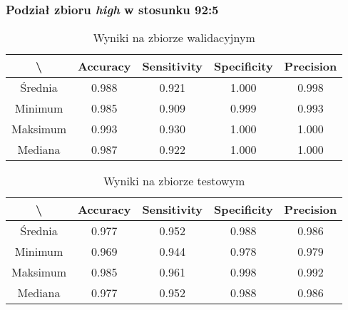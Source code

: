 \newpage
\subsubsection{Podział zbioru \textit{high} w stosunku 92:5}

\begin{table}[!h]
	\centering
	\caption{Wyniki na zbiorze walidacyjnym}
	\vspace{6pt}
	{\footnotesize
		\begin{tabular}{|c|c|c|c|c|}
      \hline \textbackslash & Accuracy & Sensitivity & Specificity & Precision \\
      \hline Średnia & 0.988 & 0.921 & 1.000 & 0.998 \\
      \hline Minimum & 0.985 & 0.909 & 0.999 & 0.993 \\
      \hline Maksimum & 0.993 & 0.930 & 1.000 & 1.000 \\
      \hline Mediana & 0.987 & 0.922 & 1.000 & 1.000 \\
      \hline
		\end{tabular}
	}
	\vspace{0pt}
\end{table}

\begin{table}[!h]
	\centering
	\caption{Wyniki na zbiorze testowym}
	\vspace{6pt}
	{\footnotesize
		\begin{tabular}{|c|c|c|c|c|}
      \hline \textbackslash & Accuracy & Sensitivity & Specificity & Precision \\
      \hline Średnia & 0.977 & 0.952 & 0.988 & 0.986 \\
      \hline Minimum & 0.969 & 0.944 & 0.978 & 0.979 \\
      \hline Maksimum & 0.985 & 0.961 & 0.998 & 0.992 \\
      \hline Mediana & 0.977 & 0.952 & 0.988 & 0.986 \\
      \hline
		\end{tabular}
	}
	\vspace{0pt}
\end{table}
